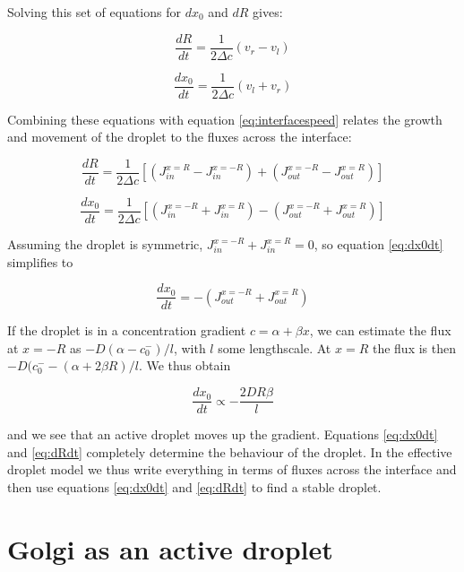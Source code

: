 \documentclass{Dissertate}
\begin{document}
Solving this set of equations for \(dx_0\) and \(dR\) gives:

\begin{equation}
\frac{dR}{dt}=\frac{1}{2\Delta c}(v_r-v_l)
\label{eq:radius}\end{equation}

\begin{equation}
\frac{dx_0}{dt}=\frac{1}{2\Delta c}(v_l+v_r)
\label{eq:position}\end{equation}

Combining these equations with equation \ref{eq:interfacespeed}
relates the growth and movement of the droplet to the fluxes
across the interface: 

\begin{equation}
	\label{eq:dRdt}
	\frac{dR}{dt}=\frac{1}{2\Delta c}\left[(J_{in}^{x=R}-J_{in}^{x=-R})+(J_{out}^{x=-R}-J_{out}^{x=R})\right]
\end{equation}

\begin{equation}
\label{eq:dx0dt}
	\frac{dx_0}{dt}=\frac{1}{2\Delta c}\left[(J_{in}^{x=-R}+J_{in}^{x=R})-(J_{out}^{x=-R}+J_{out}^{x=R})\right]
\end{equation}

Assuming the droplet is symmetric, $J_{in}^{x=-R}+J_{in}^{x=R}=0$, so equation \ref{eq:dx0dt} simplifies to

\begin{equation}
	\frac{dx_0}{dt}=-(J_{out}^{x=-R}+J_{out}^{x=R})
\end{equation}

If the droplet is in a concentration gradient $c = \alpha+\beta x$, we can estimate the flux at $x=-R$ as $-D(\alpha-c_0^-)/l$, with $l$ some lengthscale. At $x=R$ the flux is then $-D(c_0^--(\alpha+2\beta R)/l$. We thus obtain

\begin{equation}
	\frac{dx_0}{dt} \propto -\frac{2DR\beta}{l}
\end{equation}

and we see that an active droplet moves up the gradient. Equations \ref{eq:dx0dt} and \ref{eq:dRdt} completely determine the behaviour of the droplet. In the effective droplet model we thus write everything in terms of fluxes across the interface and then use equations \ref{eq:dx0dt} and \ref{eq:dRdt} to find a stable droplet.

\hypertarget{Golgi-as-an-active-droplet}{%
\section{Golgi as an active droplet}\label{Golgi-as-an-active-droplet}}
\end{document}
